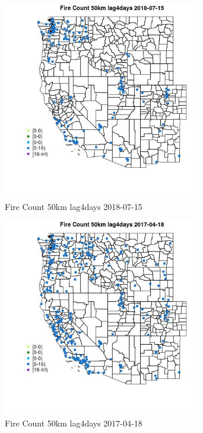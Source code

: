 \begin{figure} 
\centering  
\includegraphics[width=0.77\textwidth]{Code_Outputs/Report_ML_input_PM25_Step4_part_e_de_duplicated_aves_compiled_2019-05-20wNAs_MapObsFire_Count_50km_lag4days2018-07-15.jpg} 
\caption{\label{fig:Report_ML_input_PM25_Step4_part_e_de_duplicated_aves_compiled_2019-05-20wNAsMapObsFire_Count_50km_lag4days2018-07-15}Fire Count 50km lag4days 2018-07-15} 
\end{figure} 
 

\begin{figure} 
\centering  
\includegraphics[width=0.77\textwidth]{Code_Outputs/Report_ML_input_PM25_Step4_part_e_de_duplicated_aves_compiled_2019-05-20wNAs_MapObsFire_Count_50km_lag4days2017-04-18.jpg} 
\caption{\label{fig:Report_ML_input_PM25_Step4_part_e_de_duplicated_aves_compiled_2019-05-20wNAsMapObsFire_Count_50km_lag4days2017-04-18}Fire Count 50km lag4days 2017-04-18} 
\end{figure} 
 

